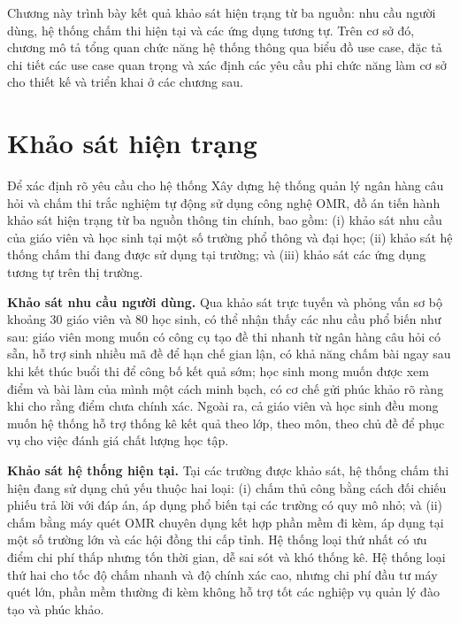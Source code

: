 ﻿\documentclass[../DoAn.tex]{subfiles}
\begin{document}
Chương này trình bày kết quả khảo sát hiện trạng từ ba nguồn: nhu cầu người dùng, hệ thống chấm thi hiện tại và các ứng dụng tương tự. Trên cơ sở đó, chương mô tả tổng quan chức năng hệ thống thông qua biểu đồ use case, đặc tả chi tiết các use case quan trọng và xác định các yêu cầu phi chức năng làm cơ sở cho thiết kế và triển khai ở các chương sau.

\section{Khảo sát hiện trạng}
\label{section:2.1}

Để xác định rõ yêu cầu cho hệ thống Xây dựng hệ thống quản lý ngân hàng câu hỏi và chấm thi trắc nghiệm tự động sử dụng công nghệ OMR, đồ án tiến hành khảo sát hiện trạng từ ba nguồn thông tin chính, bao gồm: (i) khảo sát nhu cầu của giáo viên và học sinh tại một số trường phổ thông và đại học; (ii) khảo sát hệ thống chấm thi đang được sử dụng tại trường; và (iii) khảo sát các ứng dụng tương tự trên thị trường.

\noindent\textbf{Khảo sát nhu cầu người dùng.} Qua khảo sát trực tuyến và phỏng vấn sơ bộ khoảng 30 giáo viên và 80 học sinh, có thể nhận thấy các nhu cầu phổ biến như sau: giáo viên mong muốn có công cụ tạo đề thi nhanh từ ngân hàng câu hỏi có sẵn, hỗ trợ sinh nhiều mã đề để hạn chế gian lận, có khả năng chấm bài ngay sau khi kết thúc buổi thi để công bố kết quả sớm; học sinh mong muốn được xem điểm và bài làm của mình một cách minh bạch, có cơ chế gửi phúc khảo rõ ràng khi cho rằng điểm chưa chính xác. Ngoài ra, cả giáo viên và học sinh đều mong muốn hệ thống hỗ trợ thống kê kết quả theo lớp, theo môn, theo chủ đề để phục vụ cho việc đánh giá chất lượng học tập.

\noindent\textbf{Khảo sát hệ thống hiện tại.} Tại các trường được khảo sát, hệ thống chấm thi hiện đang sử dụng chủ yếu thuộc hai loại: (i) chấm thủ công bằng cách đối chiếu phiếu trả lời với đáp án, áp dụng phổ biến tại các trường có quy mô nhỏ; và (ii) chấm bằng máy quét OMR chuyên dụng kết hợp phần mềm đi kèm, áp dụng tại một số trường lớn và các hội đồng thi cấp tỉnh.
Hệ thống loại thứ nhất có ưu điểm chi phí thấp nhưng tốn thời gian, dễ sai sót và khó thống kê. Hệ thống loại thứ hai cho tốc độ chấm nhanh và độ chính xác cao, nhưng chi phí đầu tư máy quét lớn, phần mềm thường đi kèm không hỗ trợ tốt các nghiệp vụ quản lý đào tạo và phúc khảo.
\end{document}
